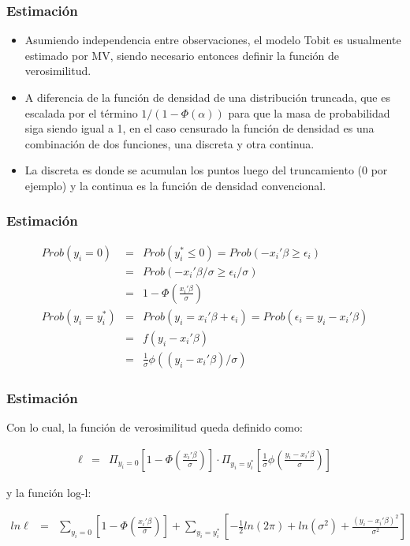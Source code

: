 \begin{frame}
	\frametitle{Estimación}
	
	\begin{itemize}
		\item  Asumiendo independencia entre observaciones, el modelo Tobit es
		usualmente estimado por MV, siendo necesario entonces definir la
		función de verosimilitud. 
		\item A diferencia de la función de densidad de una distribución truncada, que es escalada por el término $1/(1-\Phi(\alpha))$ para que la masa de probabilidad siga siendo
		igual a 1, en el caso censurado la función de densidad es una
		combinación de dos funciones, una discreta y otra continua. 
		\item La discreta es donde se acumulan los puntos luego del truncamiento (0
		por ejemplo) y la continua es la función de densidad convencional.
	\end{itemize}
	
\end{frame}

\begin{frame}
	\frametitle{Estimación}
	
	\begin{eqnarray*}
		Prob(y_i=0) &=& Prob(y^*_i \leq 0)=Prob(-x_i'\beta \geq \epsilon_i) \\
		&=& Prob(-x_i'\beta/\sigma \geq \epsilon_i/\sigma) \\
		&=& 1-\Phi(\frac{x_i'\beta}{\sigma}) \\
		Prob(y_i=y_i^*) &=& Prob(y_i=x_i'\beta+\epsilon_i)=Prob(\epsilon_i=y_i-x_i'\beta)  \\
		&=& f(y_i-x_i'\beta) \\
		&=& \frac{1}{\sigma}\phi((y_i-x_i'\beta)/\sigma)
	\end{eqnarray*}
	
\end{frame}

\begin{frame}
	\frametitle{Estimación}
	
	Con lo cual, la función de verosimilitud queda definido como:
	
	\begin{eqnarray*}
		\ell &=& \Pi_{y_i=0}\left[1-\Phi\left( \frac{x_i'\beta}{\sigma} \right)
		\right] \cdot \Pi_{y_i=y_i^*}\left[\frac{1}{\sigma}\phi\left(\frac{y_i-x_i'\beta}{\sigma}\right)\right]
	\end{eqnarray*}
	
	y la función log-l:
	
	\begin{eqnarray*}
		ln \ell &=& \sum_{y_i=0}\left[1-\Phi\left( \frac{x_i'\beta}{\sigma} \right)
		\right] + \sum_{y_i=y_i^*} \left[ -\frac{1}{2} ln(2 \pi)+ln(\sigma^2) +
		\frac{(y_i-x_i'\beta)^2}{\sigma^2} \right]
	\end{eqnarray*}
	
\end{frame}

